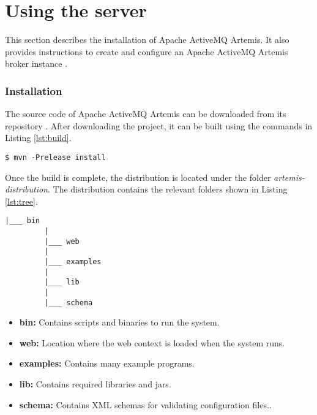 \section{Using the server}

This section describes the installation of Apache ActiveMQ Artemis. It also provides instructions to create and configure an Apache ActiveMQ Artemis broker instance \parencite{artemis_server}.

\subsubsection{Installation}

The source code of Apache ActiveMQ Artemis can be downloaded from its repository \parencite{artemis_github}. After downloading the project, it can be built using the commands in Listing \ref{lst:build}.

\bigskip
\begin{lstlisting}[style=BashInputStyle,caption=Building Apache ActiveMQ Artemis, label={lst:build}]
  $ mvn -Prelease install
\end{lstlisting}

Once the build is complete, the distribution is located under the folder \textit{artemis-distribution}.
The distribution contains the relevant folders shown in Listing \ref{lst:tree}.

\begin{lstlisting}[style=Tree,caption=Apache ActiveMQ Artemis folders, label={lst:tree}]
         |___ bin
         |
         |___ web
         |
         |___ examples
         |
         |___ lib
         |
         |___ schema
\end{lstlisting}

\begin{itemize}
    \item \textbf{bin:}
        Contains scripts and binaries to run the system.

    \item \textbf{web:}
        Location where the web context is loaded when the system runs.

    \item \textbf{examples:}
        Contains many example programs.

    \item \textbf{lib:}
        Contains required libraries and jars.

    \item \textbf{schema:}
        Contains XML schemas for validating configuration files..
         
\end{itemize}


